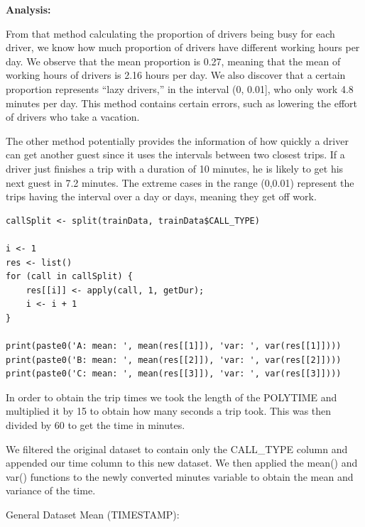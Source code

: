 \documentclass[11pt]{article}
\begin{document}
\noindent\textbf{Analysis:}\\
\par
From that method calculating the proportion of drivers being busy for each driver, we know how much proportion of drivers have different working
hours per day. We observe that the mean proportion is 0.27, meaning that the mean of working hours of drivers is 2.16 hours per day. We also discover
that a certain proportion represents “lazy drivers,” in the interval (0, 0.01], who only work 4.8 minutes per day. This method contains certain errors,
such as lowering the effort of drivers who take a vacation.
\par
	The other method potentially provides the information of how quickly a driver can get another guest since it uses the intervals between two closest
	trips. If a driver just finishes a trip with a duration of 10 minutes, he is likely to get his next guest in 7.2 minutes. The extreme cases in the
	range (0,0.01) represent the trips having the interval over a day or days, meaning they get off work.

\newpage

\begin{lstlisting}
callSplit <- split(trainData, trainData$CALL_TYPE)

i <- 1
res <- list()
for (call in callSplit) {
	res[[i]] <- apply(call, 1, getDur);
	i <- i + 1
}
  
print(paste0('A: mean: ', mean(res[[1]]), 'var: ', var(res[[1]])))
print(paste0('B: mean: ', mean(res[[2]]), 'var: ', var(res[[2]])))
print(paste0('C: mean: ', mean(res[[3]]), 'var: ', var(res[[3]])))
\end{lstlisting}

\flushleft\par
In order to obtain the trip times we took the length of the POLYTIME and multiplied it by 15 to obtain how many seconds a trip took. This was then divided by 60 to get the time in minutes.

\par
We filtered the original dataset to contain only the CALL\_TYPE column and appended our time column to this new dataset. We then applied the mean() and var() functions to the newly converted minutes variable to obtain the mean and variance of the time.

\par
General Dataset Mean (TIMESTAMP):
\end{document}
